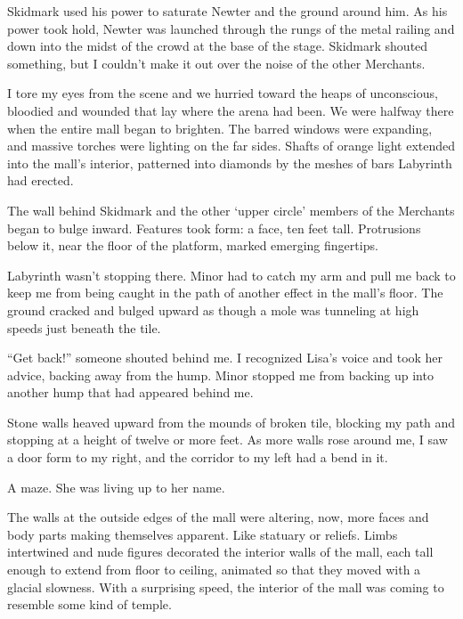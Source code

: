 Skidmark used his power to saturate Newter and the ground around him.  As his power took hold, Newter was launched through the rungs of the metal railing and down into the midst of the crowd at the base of the stage.  Skidmark shouted something, but I couldn't make it out over the noise of the other Merchants.



I tore my eyes from the scene and we hurried toward the heaps of unconscious, bloodied and wounded that lay where the arena had been.  We were halfway there when the entire mall began to brighten.  The barred windows were expanding, and massive torches were lighting on the far sides.  Shafts of orange light extended into the mall's interior, patterned into diamonds by the meshes of bars Labyrinth had erected.



The wall behind Skidmark and the other `upper circle' members of the Merchants began to bulge inward.  Features took form: a face, ten feet tall.  Protrusions below it, near the floor of the platform, marked emerging fingertips.



Labyrinth wasn't stopping there.  Minor had to catch my arm and pull me back to keep me from being caught in the path of another effect in the mall's floor.  The ground cracked and bulged upward as though a mole was tunneling at high speeds just beneath the tile.



``Get back!'' someone shouted behind me.  I recognized Lisa's voice and took her advice, backing away from the hump.  Minor stopped me from backing up into another hump that had appeared behind me.



Stone walls heaved upward from the mounds of broken tile, blocking my path and stopping at a height of twelve or more feet.  As more walls rose around me, I saw a door form to my right, and the corridor to my left had a bend in it.



A maze.  She was living up to her name.



The walls at the outside edges of the mall were altering, now, more faces and body parts making themselves apparent.  Like statuary or reliefs.  Limbs intertwined and nude figures decorated the interior walls of the mall, each tall enough to extend from floor to ceiling, animated so that they moved with a glacial slowness.  With a surprising speed, the interior of the mall was coming to resemble some kind of temple.



